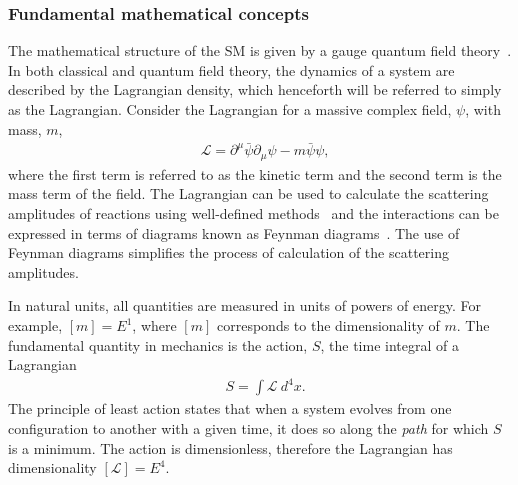 \subsubsection{Fundamental mathematical concepts}
The mathematical structure of the SM is given by a gauge quantum field theory~\cite{Peskin1995}. In both classical and quantum field theory, the dynamics of a system are described by the Lagrangian density, which henceforth will be referred to simply as the Lagrangian. Consider the Lagrangian for a massive complex field, $\psi$, with mass, $m$, 
\begin{equation}
    \label{eq:lagrangian_example}
    \begin{aligned}
        & \mathcal{L} = \partial^\mu\bar{\psi}\partial_\mu\psi - m\bar{\psi}\psi,
    \end{aligned}
\end{equation}
where the first term is referred to as the kinetic term and the second term is the mass term of the field. The Lagrangian can be used to calculate the scattering amplitudes of reactions using well-defined methods~\cite{Lehmann1955} and the interactions can be expressed in terms of diagrams known as Feynman diagrams~\cite{Thomson:2013zua}. The use of Feynman diagrams simplifies the process of calculation of the scattering amplitudes.

In natural units, all quantities are measured in units of powers of energy. For example, $[m] = E^1$, where $[m]$ corresponds to the dimensionality of $m$. The fundamental quantity in mechanics is the action, $S$, the time integral of a Lagrangian~\cite{Peskin1995}
\begin{equation}
    \label{eq:action}
    \begin{aligned}
        & S = \int \mathcal{L}~d^4x.
    \end{aligned}
\end{equation}
The principle of least action states that when a system evolves from one configuration to another with a given time, it does so along the \emph{path} for which $S$ is a minimum. The action is dimensionless, therefore the Lagrangian has dimensionality $[\mathcal{L}] = E^4$.

